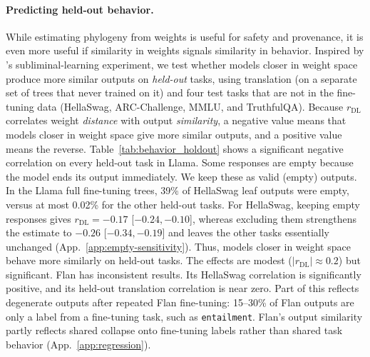 \documentclass{article}
\theoremstyle{definition}
\theoremstyle{plain}
\begin{document}
\paragraph{Predicting held-out behavior.}
\label{sec:results:behavioral}

While estimating phylogeny from weights is useful for safety and provenance, it is even more useful if similarity in weights signals similarity in behavior. Inspired by \citet{cloud2025subliminal}'s subliminal-learning experiment, we test
whether models closer in weight space produce more similar outputs on \textit{held-out} tasks, using translation
(on a separate set of trees that never trained on it) and four test tasks that are not in the fine-tuning data (HellaSwag, ARC-Challenge, MMLU, and TruthfulQA).
Because $r_{\mathrm{DL}}$ correlates weight \emph{distance} with output \emph{similarity}, a negative value means that models closer in weight space give more similar outputs, and a positive value means the reverse.
Table~\ref{tab:behavior_holdout} shows a significant negative correlation on every held-out task in Llama. Some responses are empty because the model ends its output immediately. We keep these as valid (empty) outputs. In the Llama full fine-tuning trees,
39\% of HellaSwag leaf outputs were empty, versus at most 0.02\% for the other held-out tasks. For HellaSwag, keeping empty responses gives $r_{\mathrm{DL}}=-0.17$ [$-0.24,-0.10$], whereas excluding them strengthens the estimate to $-0.26$ [$-0.34,-0.19$] and leaves the other tasks essentially unchanged (App.~\ref{app:empty-sensitivity}). Thus, models closer in weight space behave more similarly on held-out tasks. The effects are modest ($|r_{\mathrm{DL}}|\approx0.2$) but significant.
Flan has inconsistent results. Its HellaSwag correlation is significantly positive, and its held-out translation correlation is near zero. Part of this reflects degenerate outputs after repeated Flan fine-tuning: 15--30\% of Flan outputs are only a label from a fine-tuning task, such as \texttt{entailment}. Flan's output similarity partly reflects shared collapse onto fine-tuning labels rather than shared task behavior (App.~\ref{app:regression}).
\end{document}
